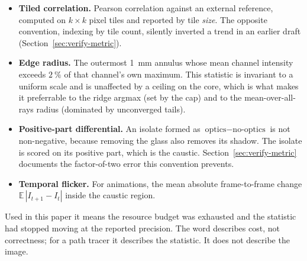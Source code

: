 \begin{itemize}
\item \textbf{Tiled correlation.} Pearson correlation against an external
reference, computed on $k \times k$ pixel tiles and reported by tile
\emph{size}. The opposite convention, indexing by tile count, silently inverted
a trend in an earlier draft
(Section~\ref{sec:verify-metric}).
\item \textbf{Edge radius.} The outermost \SI{1}{\milli\meter} annulus whose
mean channel intensity exceeds $\SI{2}{\percent}$ of that channel's own maximum.
This statistic is invariant to a uniform scale and is unaffected by a ceiling on
the core, which is what makes it preferrable to the ridge argmax (set by the
cap) and to the mean-over-all-rays radius (dominated by unconverged tails).
\item \textbf{Positive-part differential.} An isolate formed as
$\text{optics} - \text{no-optics}$ is not non-negative, because removing the
glass also removes its shadow. The isolate is scored on its positive part, which is the
caustic. Section~\ref{sec:verify-metric} documents the factor-of-two error this
convention prevents.
\item \textbf{Temporal flicker.} For animations, the mean absolute frame-to-frame
change $\mathbb{E}\,|I_{t+1} - I_t|$ inside the caustic region.
\end{itemize}

\begin{remark}
\label{rem:converged}
Used in this paper it means the resource budget was exhausted and the statistic
had stopped moving at the reported precision. The word describes cost, not
correctness; for a path tracer it describes the statistic. It does not describe the image.
\end{remark}
